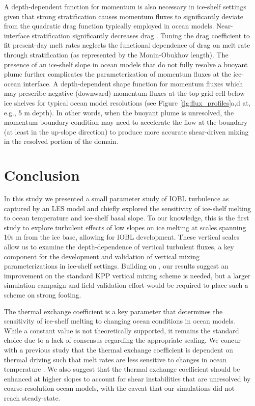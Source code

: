\documentclass[draft]{styles/agujournal2019}
\begin{document}
A depth-dependent function for momentum is also necessary in ice-shelf settings given that strong stratification causes momentum fluxes to significantly deviate from the quadratic drag function typically employed in ocean models. Near-interface stratification significantly decreases drag \cite{garcia-villalba_turbulence_2011, mcphee_revisiting_2008}. Tuning the drag coefficient to fit present-day melt rates neglects the functional dependence of drag on melt rate through stratification (as represented by the Monin-Obukhov length). The presence of an ice-shelf slope in ocean models that do not fully resolve a buoyant plume further complicates the parameterization of momentum fluxes at the ice-ocean interface. A depth-dependent shape function for momentum fluxes which may prescribe negative (downward) momentum fluxes at the top grid cell below ice shelves for typical ocean model resolutions (see Figure \ref{fig:flux_profiles}a,d at, e.g., 5 m depth). In other words, when the buoyant plume is unresolved, the momentum boundary condition may need to accelerate the flow at the boundary (at least in the up-slope direction) to produce more accurate shear-driven mixing in the resolved portion of the domain. 

\section{Conclusion}\label{conclusion}

In this study we presented a small parameter study of IOBL turbulence as captured by an LES model and chiefly explored the sensitivity of ice-shelf melting to ocean temperature and ice-shelf basal slope. To our knowledge, this is the first study to explore turbulent effects of low slopes on ice melting at scales spanning 10s m from the ice base, allowing for IOBL development. These vertical scales allow us to examine the depth-dependence of vertical turbulent fluxes, a key component for the development and validation of vertical mixing parameterizations in ice-shelf settings. Building on , our results suggest an improvement on the standard KPP vertical mixing scheme is needed, but a larger simulation campaign and field validation effort would be required to place such a scheme on strong footing. 

The thermal exchange coefficient is a key parameter that determines the sensitivity of ice-shelf melting to changing ocean conditions in ocean models. While a constant value is not theoretically supported, it remains the standard choice due to a lack of consensus regarding the appropriate scaling. We concur with a previous study that the thermal exchange coefficient is dependent on thermal driving such that melt rates are less sensitive to changes in ocean temperature \cite{vreugdenhil_stratification_2019}. We also suggest that the thermal exchange coefficient should be enhanced at higher slopes to account for shear instabilities that are unresolved by coarse-resolution ocean models, with the caveat that our simulations did not reach steady-state. 
\end{document}
